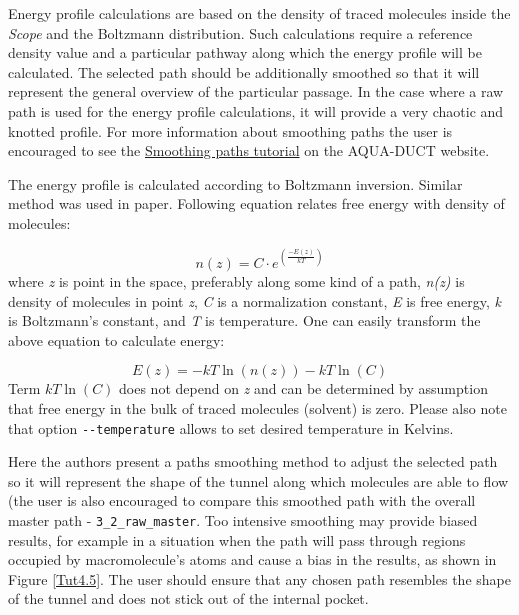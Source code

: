 \documentclass[9pt,tutorial]{livecoms}
\begin{document}
Energy profile calculations are based on the density of traced molecules inside the \emph{Scope} and the Boltzmann distribution. Such calculations require a reference density value and a particular pathway along which the energy profile will be calculated. The selected path should be additionally smoothed so that it will represent the general overview of the particular passage. In the case where a raw path is used for the energy profile calculations, it will provide a very chaotic and knotted profile. For more information about smoothing paths the user is encouraged to see the \href{http://www.aquaduct.pl/smoothing-paths/}{Smoothing paths tutorial} on the AQUA-DUCT website.

The energy profile is calculated according to Boltzmann inversion. Similar method was used in \cite{Rao2017} paper. Following equation relates free energy with density of molecules:

\[ \textstyle n\left(z\right) = C \cdot \textstyle e^{ \textstyle \left(\frac{-E\left(z\right)}{kT}\right)} \]
where \textit{z} is point in the space, preferably along some kind of a path, \textit{n(z)} is density of molecules in point \textit{z}, \textit{C} is a normalization constant, \textit{E} is free energy, \textit{k} is Boltzmann’s constant, and \textit{T} is temperature.
One can easily transform the above equation to calculate energy:

\[ \displaystyle E\left(z\right) = -kT\ln\left( n\left( z\right)\right) - kT\ln\left(C\right) \]
Term \( \displaystyle kT\ln\left(C\right)\) does not depend on \textit{z} and can be determined by assumption that free energy in the bulk of traced molecules (solvent) is zero. Please also note that option \texttt{-{}-temperature} allows to set desired temperature in Kelvins.

Here the authors present a paths smoothing method to adjust the selected path so it will represent the shape of the tunnel along which molecules are able to flow (the user is also encouraged to compare this smoothed path with the overall master path -  \texttt{3\_2\_raw\_master}. Too intensive smoothing may provide biased results, for example in a situation when the path will pass through regions occupied by macromolecule's atoms and cause a bias in the results, as shown in Figure \ref{Tut4.5}. The user should ensure that any chosen path resembles the shape of the tunnel and does not stick out of the internal pocket.
\end{document}
